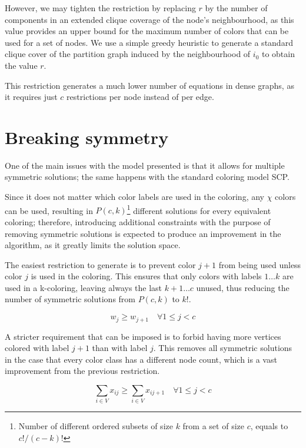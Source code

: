 However, we may tighten the restriction by replacing $r$ by the number of components in an extended clique coverage of the node's neighbourhood, as this value provides an upper bound for the maximum number of colors that can be used for a set of nodes. We use a simple greedy heuristic to generate a standard clique cover of the partition graph induced by the neighbourhood of $i_0$ to obtain the value $r$.

This restriction generates a much lower number of equations in dense graphs, as it requires just $c$ restrictions per node instead of per edge.

\section{Breaking symmetry}
\label{subsec:model:symmetry}

One of the main issues with the model presented is that it allows for multiple symmetric solutions; the same happens with the standard coloring model SCP. 

Since it does not matter which color labels are used in the coloring, any $\chi$ colors can be used, resulting in $P(c,k)$\footnote{Number of different ordered subsets of size $k$ from a set of size $c$, equals to $c! / (c - k)!$} different solutions for every equivalent coloring; therefore, introducing additional constraints with the purpose of removing symmetric solutions is expected to produce an improvement in the algorithm, as it greatly limits the solution space.

The easiest restriction to generate is to prevent color $j+1$ from being used unless color $j$ is used in the coloring. This ensures that only colors with labels $1 \ldots k$ are used in a k-coloring, leaving always the last $k+1 \ldots c$ unused, thus reducing the number of symmetric solutions from $P(c,k)$ to $k!$.

\begin{equation}
\label{eqn:lowerlabel}
w_j \geq w_{j+1} \quad \forall 1 \leq j < c 
\end{equation}

A stricter requirement that can be imposed is to forbid having more vertices colored with label $j+1$ than with label $j$. This removes all symmetric solutions in the case that every color class has a different node count, which is a vast improvement from the previous restriction.

\begin{equation}
\label{eqn:symnodecount}
\sum_{i \in V} x_{ij} \geq \sum_{i \in V} x_{ij+1} \quad \forall 1 \leq j < c 
\end{equation}

